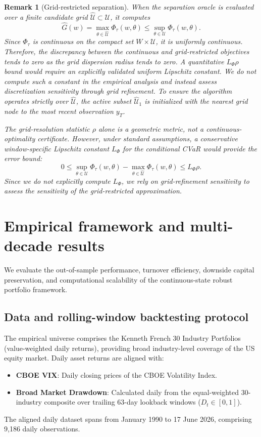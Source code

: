 \documentclass[11pt, a4paper]{article}
\newtheorem{remark}{Remark}
\begin{document}
\begin{remark}[Grid-restricted separation]
When the separation oracle is evaluated over a finite candidate grid $\widehat{\mathcal{U}} \subset \mathcal{U}$, it computes
\begin{equation}
\widehat{G}(w) = \max_{\theta \in \widehat{\mathcal{U}}} \Phi_\tau(w, \theta) \le \sup_{\theta \in \mathcal{U}} \Phi_\tau(w, \theta).
\end{equation}
Since $\Phi_\tau$ is continuous on the compact set $W \times \mathcal{U}$, it is uniformly continuous. Therefore, the discrepancy between the continuous and grid-restricted objectives tends to zero as the grid dispersion radius tends to zero. A quantitative $L_\Phi\rho$ bound would require an explicitly validated uniform Lipschitz constant. We do not compute such a constant in the empirical analysis and instead assess discretization sensitivity through grid refinement. To ensure the algorithm operates strictly over $\widehat{\mathcal{U}}$, the active subset $\widehat{\mathcal{U}}_1$ is initialized with the nearest grid node to the most recent observation $y_T$.


The grid-resolution statistic $\rho$ alone is a geometric metric, not a continuous-optimality certificate. However, under standard assumptions, a conservative window-specific Lipschitz constant $L_\Phi$ for the conditional CVaR would provide the error bound:
\begin{equation}
0 \le \sup_{\theta \in \mathcal{U}} \Phi_\tau(w, \theta) - \max_{\theta \in \widehat{\mathcal{U}}} \Phi_\tau(w, \theta) \le L_\Phi \rho.
\end{equation}
Since we do not explicitly compute $L_\Phi$, we rely on grid-refinement sensitivity to assess the sensitivity of the grid-restricted approximation.

\end{remark}

\section{Empirical framework and multi-decade results}
We evaluate the out-of-sample performance, turnover efficiency, downside capital preservation, and computational scalability of the continuous-state robust portfolio framework.

\subsection{Data and rolling-window backtesting protocol}
The empirical universe comprises the Kenneth French 30 Industry Portfolios (value-weighted daily returns), providing broad industry-level coverage of the US equity market. Daily asset returns are aligned with:
\begin{itemize}
    \item \textbf{CBOE VIX}: Daily closing prices of the CBOE Volatility Index.
    \item \textbf{Broad Market Drawdown}: Calculated daily from the equal-weighted 30-industry composite over trailing 63-day lookback windows ($D_t \in [0, 1]$).
\end{itemize}
The aligned daily dataset spans from January 1990 to 17 June 2026, comprising 9,186 daily observations.
\end{document}

